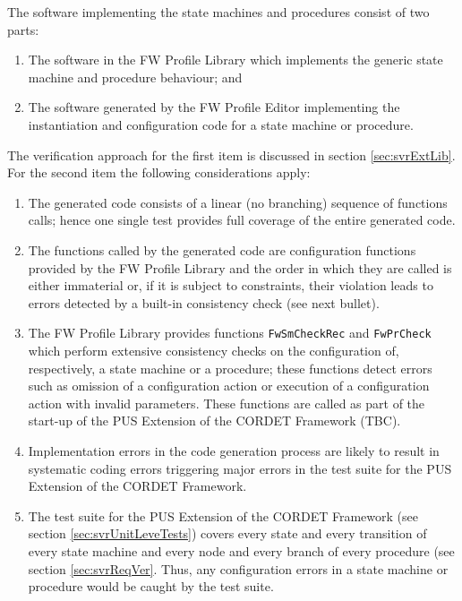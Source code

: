 \documentclass{pnp_article}
\begin{document}
The software implementing the state machines and procedures consist of two parts:

\begin{enumerate}
\item The software in the FW Profile Library which implements the generic state machine and procedure behaviour; and
\item The software generated by the FW Profile Editor implementing the instantiation and configuration code for a state machine or procedure.
\end{enumerate}

The verification approach for the first item is discussed in section \ref{sec:svrExtLib}. For the second item the following considerations apply:

\begin{enumerate}
\item The generated code consists of a linear (no branching) sequence of functions calls; hence one single test provides full coverage of the entire generated code.
\item The functions called by the generated code are configuration functions provided by the FW Profile Library and the order in which they are called is either immaterial or, if it is subject to constraints, their violation leads to errors detected by a built-in consistency check (see next bullet).
\item The FW Profile Library provides functions \texttt{FwSmCheckRec} and \texttt{FwPrCheck} which perform extensive consistency checks on the configuration of, respectively, a state machine or a procedure; these functions detect errors such as omission of a configuration action or execution of a configuration action with invalid parameters. These functions are called as part of the start-up of the PUS Extension of the CORDET Framework (TBC).
\item Implementation errors in the code generation process are likely to result in systematic coding errors triggering major errors in the test suite for the PUS Extension of the CORDET Framework.
\item The test suite for the PUS Extension of the CORDET Framework (see section \ref{sec:svrUnitLeveTests}) covers every state and every transition of every state machine and every node and every branch of every procedure (see section \ref{sec:svrReqVer}. Thus, any configuration errors in a state machine or procedure would be caught by the test suite.
\end{enumerate}
\end{document}
